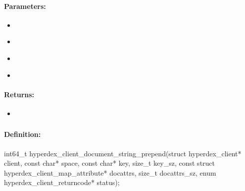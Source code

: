 \paragraph{Parameters:}
\begin{itemize}[noitemsep]
\item {}\\

\item {}\\

\item {}\\

\item {}\\

\end{itemize}

\paragraph{Returns:}
\begin{itemize}[noitemsep]
\item {}\\

\end{itemize}

\pagebreak
\subsubsection{}
\label{api:c:document_string_prepend}


\paragraph{Definition:}
\begin{ccode}
int64_t hyperdex_client_document_string_prepend(struct hyperdex_client* client,
        const char* space,
        const char* key, size_t key_sz,
        const struct hyperdex_client_map_attribute* docattrs, size_t docattrs_sz,
        enum hyperdex_client_returncode* status);
\end{ccode}

